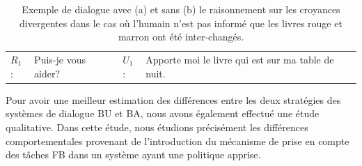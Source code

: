 \documentclass[a4paper,11pt,twoside]{StyleThese}
\begin{document}
\begin{table}
\centering
\scriptsize
  \begin{tabular}{llll}
  \hline
  $R_1$: & Puis-je vous aider? & $U_1$: & Apporte moi le livre qui est sur ma table de nuit.\\
\end{tabular}
  \vfill
  \qquad
  \caption{Exemple de dialogue avec (a) et sans (b) le raisonnement sur les croyances divergentes dans le cas où l'humain n'est pas informé que les livres rouge et marron ont été inter-changés.
  }
 \label{table:qualitative-samples}
 \end{table}

Pour avoir une meilleur estimation des différences entre les deux stratégies des systèmes de dialogue BU et BA, nous avons également effectué une étude qualitative. Dans cette étude, nous étudions précisément les différences comportementales provenant de l'introduction du mécanisme de prise en compte des tâches FB dans un système ayant une politique apprise. 
\end{document}
